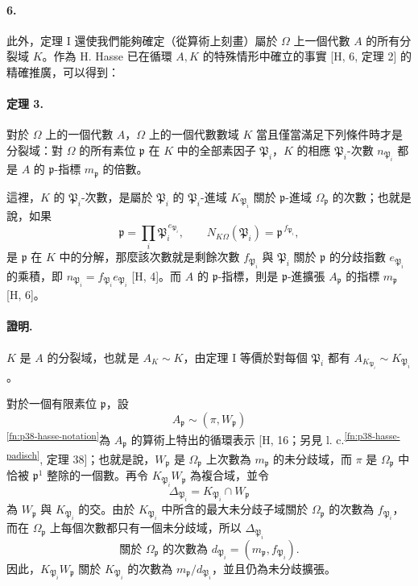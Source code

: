 \documentclass[11pt]{article}
\begin{document}
\paragraph{6.}
此外，定理 I 還使我們能夠確定（從算術上刻畫）屬於 \(\Omega\) 上一個代數 \(A\) 的所有分裂域 \(K\)。作為 H. Hasse 已在循環 \(A,K\) 的特殊情形中確立的事實 [H, 6, 定理 2] 的精確推廣，可以得到：

\paragraph{定理 3.}
對於 \(\Omega\) 上的一個代數 \(A\)，\(\Omega\) 上的一個代數數域 \(K\) 當且僅當滿足下列條件時才是分裂域：對 \(\Omega\) 的所有素位 \(\mathfrak p\) 在 \(K\) 中的全部素因子 \(\mathfrak P_i\)，\(K\) 的相應 \(\mathfrak P_i\)-次數 \(n_{\mathfrak P_i}\) 都是 \(A\) 的 \(\mathfrak p\)-指標 \(m_{\mathfrak p}\) 的倍數。

這裡，\(K\) 的 \(\mathfrak P_i\)-次數，是屬於 \(\mathfrak P_i\) 的 \(\mathfrak P_i\)-進域 \(K_{\mathfrak P_i}\) 關於 \(\mathfrak p\)-進域 \(\Omega_{\mathfrak p}\) 的次數；也就是說，如果
\[
\mathfrak p=\prod_i \mathfrak P_i^{\,e_{\mathfrak P_i}},
        \qquad N_{K\Omega}(\mathfrak P_i)=\mathfrak p^{\,f_{\mathfrak P_i}},
\]
是 \(\mathfrak p\) 在 \(K\) 中的分解，那麼該次數就是剩餘次數 \(f_{\mathfrak P_i}\) 與 \(\mathfrak P_i\) 關於 \(\mathfrak p\) 的分歧指數 \(e_{\mathfrak P_i}\) 的乘積，即 \(n_{\mathfrak P_i}=f_{\mathfrak P_i}e_{\mathfrak P_i}\) [H, 4]。而 \(A\) 的 \(\mathfrak p\)-指標，則是 \(\mathfrak p\)-進擴張 \(A_{\mathfrak p}\) 的指標 \(m_{\mathfrak p}\) [H, 6]。

\paragraph{證明.}
\(K\) 是 \(A\) 的分裂域，也就\,是 \(A_K\sim K\)，由定理 I 等價於對每個 \(\mathfrak P_i\) 都有 \(A_{K_{\mathfrak P_i}}\sim K_{\mathfrak P_i}\)。

對於一個有限素位 \(\mathfrak p\)，設
\[
        A_{\mathfrak p}\sim(\pi,W_{\mathfrak p})
\]
\textsuperscript{\ref{fn:p38-hasse-notation}}為 \(A_{\mathfrak p}\) 的算術上特出的循環表示 [H, 16；另見 l. c.\textsuperscript{\ref{fn:p38-hasse-padisch}}, 定理 38]；也就是說，\(W_{\mathfrak p}\) 是 \(\Omega_{\mathfrak p}\) 上次數為 \(m_{\mathfrak p}\) 的未分歧域，而 \(\pi\) 是 \(\Omega_{\mathfrak p}\) 中恰被 \(\mathfrak p^1\) 整除的一個數。再令 \(K_{\mathfrak P_i}W_{\mathfrak p}\) 為複合域，並令
\[
        \Delta_{\mathfrak P_i}=K_{\mathfrak P_i}\cap W_{\mathfrak p}
\]
為 \(W_{\mathfrak p}\) 與 \(K_{\mathfrak P_i}\) 的交。由於 \(K_{\mathfrak P_i}\) 中所含的最大未分歧子域關於 \(\Omega_{\mathfrak p}\) 的次數為 \(f_{\mathfrak P_i}\)，而在 \(\Omega_{\mathfrak p}\) 上每個次數都只有一個未分歧域，所以 \(\Delta_{\mathfrak P_i}\)
\[
        \text{關於 }\Omega_{\mathfrak p}\text{ 的次數為 }d_{\mathfrak P_i}=(m_{\mathfrak p},f_{\mathfrak P_i}).
\]
因此，\(K_{\mathfrak P_i}W_{\mathfrak p}\) 關於 \(K_{\mathfrak P_i}\) 的次數為 \(m_{\mathfrak p}/d_{\mathfrak P_i}\)，並且仍為未分歧擴張。
\end{document}
